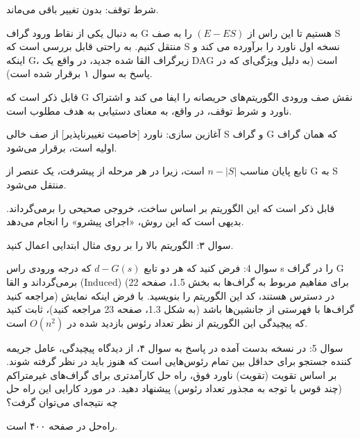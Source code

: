 \documentclass{book} %
\begin{document}
شرط توقف: بدون تغییر باقی می‌ماند.

به دنبال یکی از نقاط ورود گراف G هستیم تا این راس از $(E − ES )$ را به صف S منتقل کنیم.
به راحتی قابل بررسی است که S نسخه اول ناورد را برآورده می کند و اینکه G، زیرگراف القا
شده جدید، در واقع یک DAG است (به دلیل ویژگی‌ای که در پاسخ به سوال ۱ برقرار شده است).

قابل ذکر است که G نقش صف ورودی الگوریتم‌های حریصانه را ایفا می کند و اشتراک ناورد و
شرط توقف، در واقع، به معنای دستیابی به هدف مطلوب است.

آغازین سازی: ناورد [خاصیت تغییرناپذیر] از صف خالی S
و گراف G که همان گراف اولیه است، برقرار می‌شود.

تابع پایان مناسب $n−|S|$ است، زیرا در هر مرحله از پیشرفت، یک عنصر از G به S منتقل می‌شود.

قابل ذکر است که این الگوریتم بر اساس ساخت، خروجی صحیحی را برمی‌گرداند. بدیهی است که این روش، «اجرای پیشرو» را انجام می‌دهد.

سوال ۳: الگوریتم بالا را بر روی مثال ابتدایی اعمال کنید.


سوال 4: فرض کنید که هر دو تابع $d−G(s)$ که درجه ورودی راس s را در گراف G برمی‌گرداند
و القا (Induced) (برای مفاهیم مربوط به گراف‌ها به بخش 1.5، صفحه 22 مراجعه کنید) در دسترس هستند،
کد این الگوریتم را بنویسید. با فرض اینکه نمایش گراف‌ها با فهرستی از جانشین‌ها باشد
(به شکل 1.3، صفحه 23 مراجعه کنید)، ثابت کنید که پیچیدگی این الگوریتم از نظر تعداد رئوس بازدید شده
در $O(n^{2})$ است.

سوال 5: در نسخه بدست آمده در پاسخ به سوال ۴، از دیدگاه پیچیدگی، عامل جریمه کننده
جستجو برای حداقل بین تمام رئوس‌هایی است که هنوز باید در نظر گرفته شوند. بر اساس تقویت (تقویت) ناورد فوق، راه حل کارآمدتری برای گراف‌های غیرمتراکم (چند قوس با توجه به مجذور تعداد رئوس) پیشنهاد دهید. در مورد کارایی
این راه حل چه نتیجه‌ای می‌توان گرفت؟

راه‌حل در صفحه ۴۰۰ است.
\end{document}
